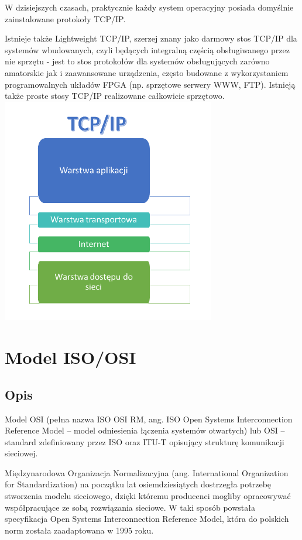 \documentclass{article}
\begin{document}
W dzisiejszych czasach, praktycznie każdy system operacyjny posiada domyślnie zainstalowane protokoły TCP/IP.

Istnieje także Lightweight TCP/IP, szerzej znany jako darmowy stos TCP/IP dla systemów wbudowanych, czyli będących integralną częścią obsługiwanego przez nie sprzętu - jest to stos protokołów dla systemów obsługujących zarówno amatorskie jak i zaawansowane urządzenia, często budowane z wykorzystaniem programowalnych układów FPGA (np. sprzętowe serwery WWW, FTP). Istnieją także proste stosy TCP/IP realizowane całkowicie sprzętowo.
\includegraphics[width=0.7\textwidth]{tcp.png}

\section{Model ISO/OSI}
\subsection{Opis}
	Model OSI (pełna nazwa ISO OSI RM, ang. ISO Open Systems Interconnection Reference Model – model odniesienia łączenia systemów otwartych) lub OSI – standard zdefiniowany przez ISO oraz ITU-T opisujący strukturę komunikacji sieciowej.

Międzynarodowa Organizacja Normalizacyjna (ang. International Organization for Standardization) na początku lat osiemdziesiątych dostrzegła potrzebę stworzenia modelu sieciowego, dzięki któremu producenci mogliby opracowywać współpracujące ze sobą rozwiązania sieciowe. W taki sposób powstała specyfikacja Open Systems Interconnection Reference Model, która do polskich norm została zaadaptowana w 1995 roku.
\end{document}
